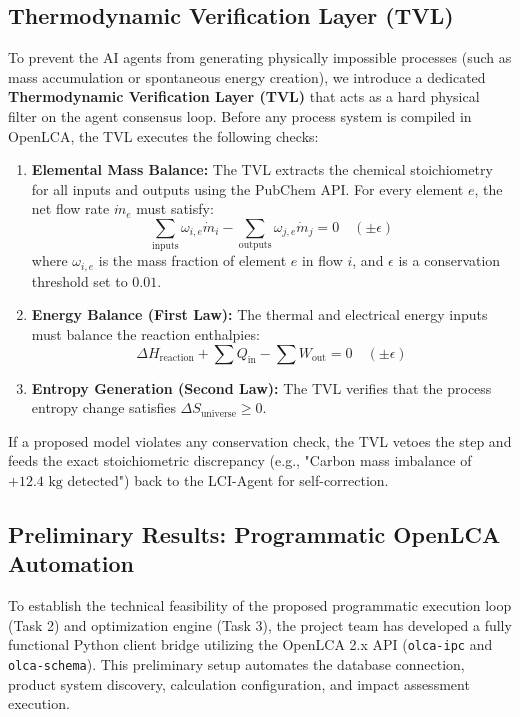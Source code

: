 \documentclass[11pt]{article}
\begin{document}
\subsection{Thermodynamic Verification Layer (TVL)}
To prevent the AI agents from generating physically impossible processes (such as mass accumulation or spontaneous energy creation), we introduce a dedicated \textbf{Thermodynamic Verification Layer (TVL)} that acts as a hard physical filter on the agent consensus loop. Before any process system is compiled in OpenLCA, the TVL executes the following checks:
\begin{enumerate}
    \item \textbf{Elemental Mass Balance:} The TVL extracts the chemical stoichiometry for all inputs and outputs using the PubChem API. For every element $e$, the net flow rate $\dot{m}_e$ must satisfy:
    \begin{equation}
        \sum_{\text{inputs}} \omega_{i,e} \dot{m}_i - \sum_{\text{outputs}} \omega_{j,e} \dot{m}_j = 0 \quad (\pm \epsilon)
    \end{equation}
    where $\omega_{i,e}$ is the mass fraction of element $e$ in flow $i$, and $\epsilon$ is a conservation threshold set to $0.01$.
    \item \textbf{Energy Balance (First Law):} The thermal and electrical energy inputs must balance the reaction enthalpies:
    \begin{equation}
        \Delta H_{\text{reaction}} + \sum Q_{\text{in}} - \sum W_{\text{out}} = 0 \quad (\pm \epsilon)
    \end{equation}
    \item \textbf{Entropy Generation (Second Law):} The TVL verifies that the process entropy change satisfies $\Delta S_{\text{universe}} \ge 0$.
\end{enumerate}
If a proposed model violates any conservation check, the TVL vetoes the step and feeds the exact stoichiometric discrepancy (e.g., "Carbon mass imbalance of $+12.4\text{ kg}$ detected") back to the LCI-Agent for self-correction.

\subsection{Preliminary Results: Programmatic OpenLCA Automation}
To establish the technical feasibility of the proposed programmatic execution loop (Task 2) and optimization engine (Task 3), the project team has developed a fully functional Python client bridge utilizing the OpenLCA 2.x API (\texttt{olca-ipc} and \texttt{olca-schema}). This preliminary setup automates the database connection, product system discovery, calculation configuration, and impact assessment execution.
\end{document}
